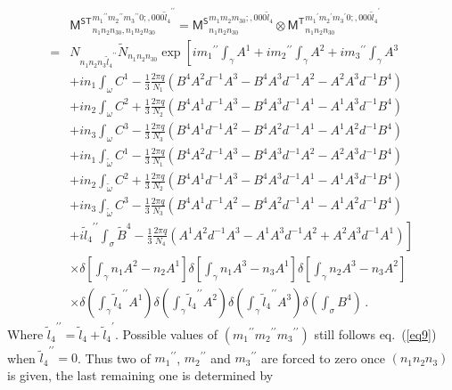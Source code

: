 \documentclass[11pt,nofootinbib,preprint]{revtex4-1}
\begin{document}
\begin{align}
	&{\mathsf{M}^{\mathsf{ST}}}_{n_1n_2n_30,n_1n_2n_30}^{{m_1}^{\prime\prime}{m_2}^{\prime\prime}{m_3}^{\prime\prime}0;,000{\tilde{l}_4}^{\prime\prime}}={\mathsf{M}^{\mathsf{S}}}_{n_1n_2n_30}^{m_1m_2m_30;,000\tilde{l}_4}\otimes {\mathsf{M}^{\mathsf{T}}}_{n_1n_2n_30}^{{m_1}^{\prime}{m_2}^{\prime}{m_3}^{\prime}0;,000{\tilde{l}_4}^{\prime}}\nonumber
	\\
	=&N_{n_1n_2n_3{\tilde{l}_4}^{\prime\prime}}\tilde{N}_{n_1n_2n_30}\exp \left[ {im_1}^{\prime\prime}\int_{\gamma}{A^1}+{im_2}^{\prime\prime}\int_{\gamma}{A^2}+{im_3}^{\prime\prime}\int_{\gamma}{A^3} \right. \nonumber
	\\
	&+in_1\int_{\omega}{C^1-\frac{1}{3}\frac{2\pi q}{N_1}\left( B^4A^2d^{-1}A^3-B^4A^3d^{-1}A^2-A^2A^3d^{-1}B^4 \right)}\nonumber
	\\
	&+in_2\int_{\omega}{C^2+\frac{1}{3}\frac{2\pi q}{N_2}\left( B^4A^1d^{-1}A^3-B^4A^3d^{-1}A^1-A^1A^3d^{-1}B^4 \right)}\nonumber
	\\
	&+in_3\int_{\omega}{C^3-\frac{1}{3}\frac{2\pi q}{N_3}\left( B^4A^1d^{-1}A^2-B^4A^2d^{-1}A^1-A^1A^2d^{-1}B^4 \right)}\nonumber
	\\
	&+in_1\int_{\tilde{\omega}}{C^1-\frac{1}{3}\frac{2\pi q}{N_1}\left( B^4A^2d^{-1}A^3-B^4A^3d^{-1}A^2-A^2A^3d^{-1}B^4 \right)}\nonumber
	\\
	&+in_2\int_{\tilde{\omega}}{C^2+\frac{1}{3}\frac{2\pi q}{N_2}\left( B^4A^1d^{-1}A^3-B^4A^3d^{-1}A^1-A^1A^3d^{-1}B^4 \right)}\nonumber
	\\
	&+in_3\int_{\tilde{\omega}}{C^3-\frac{1}{3}\frac{2\pi q}{N_3}\left( B^4A^1d^{-1}A^2-B^4A^2d^{-1}A^1-A^1A^2d^{-1}B^4 \right)} \nonumber
	\\
	&\left. +{i\tilde{l}_4}^{\prime\prime}\int_{\sigma}{\tilde{B}^4}-\frac{1}{3}\frac{2\pi q}{N_4}\left( A^1A^2d^{-1}A^3-A^1A^3d^{-1}A^2+A^2A^3d^{-1}A^1 \right) \right] \nonumber
	\\
	&\times \delta \left[ \int_{\gamma}{n_1A^2-n_2A^1} \right] \delta \left[ \int_{\gamma}{n_1A^3-n_3A^1} \right] \delta \left[ \int_{\gamma}{n_2A^3-n_3A^2} \right] \nonumber
	\\
	&\times \delta \left( \int_{\gamma}{{\tilde{l}_4}^{\prime\prime}A^1} \right) \delta \left( \int_{\gamma}{{\tilde{l}_4}^{\prime\prime}A^2} \right) \delta \left( \int_{\gamma}{{\tilde{l}_4}^{\prime\prime}A^3} \right) \delta \left( \int_{\sigma}{B^4} \right) \,.
	\label{eq_MST1}
\end{align}
Where ${\tilde{l}_4}^{\prime\prime}=\tilde{l}_4+{\tilde{l}_4}^{\prime}$. Possible values of $\left( {m_1}^{\prime\prime}{m_2}^{\prime\prime}{m_3}^{\prime\prime} \right)$ still follows eq.~(\ref{eq9}) when ${\tilde{l}_4}^{\prime\prime}=0$. Thus two of ${m_1}^{\prime\prime}$, ${m_2}^{\prime\prime}$ and ${m_3}^{\prime\prime}$ are forced to zero once $\left( n_1n_2n_3 \right)$ is given, the last remaining one is determined by 
\end{document}
